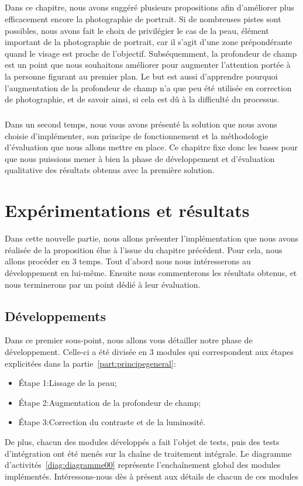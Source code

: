 \documentclass[11pt, french]{report-rd-info}
\begin{document}
\paragraph*{}
Dans ce chapitre, nous avons suggéré plusieurs propositions afin d'améliorer plus efficacement encore la photographie de portrait. Si de nombreuses pistes sont possibles, nous avons fait le choix de privilégier le cas de la peau, élément important de la photographie de portrait, car il s'agit d'une zone prépondérante quand le visage est proche de l'objectif. Subséquemment, la profondeur de champ est un point que nous souhaitons améliorer pour augmenter l'attention portée à la personne figurant au premier plan. Le but est aussi d'apprendre pourquoi l'augmentation de la profondeur de champ n'a que peu été utilisée en correction de photographie, et de savoir ainsi, si cela est dû à la difficulté du processus.

\paragraph*{}
Dans un second temps, nous vous avons présenté la solution que nous avons choisie d'implémenter, son principe de fonctionnement et la méthodologie d'évaluation que nous allons mettre en place.
Ce chapitre fixe donc les bases pour que nous puissions mener à bien la phase de développement et d'évaluation qualitative des résultats obtenus avec la première solution.


\chapter{Expérimentations et résultats}
\label{chap:Experimentations}
Dans cette nouvelle partie, nous allons présenter l'implémentation que nous avons réalisée de la proposition élue à l'issue du chapitre précédent. Pour cela, nous allons procéder en 3 temps. Tout d'abord nous nous intéresserons au développement en lui-même. Ensuite nous commenterons les résultats obtenus, et nous terminerons par un point dédié à leur évaluation.
\section{Développements}
Dans ce premier sous-point, nous allons vous détailler notre phase de développement. Celle-ci a été divisée en 3 modules qui correspondent aux étapes explicitées dans la partie~\ref{part:principegeneral}:
\begin{itemize}
\item{Étape 1:}Lissage de la peau;
\item{Étape 2:}Augmentation de la profondeur de champ;
\item{Étape 3:}Correction du contraste et de la luminosité.
\end{itemize}
De plus, chacun des modules développés a fait l'objet de tests, puis des tests d'intégration ont été menés sur la chaîne de traitement intégrale. Le diagramme d'activités~\ref{diag:diagramme00} représente l'enchaînement global des modules implémentés. Intéressons-nous dès à présent aux détails de chacun de ces modules
\end{document}
